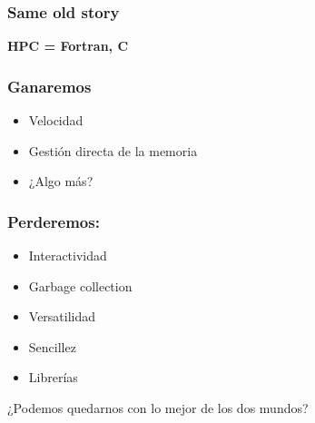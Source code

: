 \documentclass{beamer}
\begin{document}
\begin{frame}
  \frametitle{Same old story}
  \begin{center}
    \begin{Huge}
      \textbf{HPC = Fortran, C}
    \end{Huge}
  \end{center}
\end{frame}

\begin{frame}
  \frametitle{Ganaremos}
  \begin{itemize}
  \item Velocidad
  \item Gestión directa de la memoria
  \item ¿Algo más?
  \end{itemize}
\end{frame}

\begin{frame}
  \frametitle{Perderemos:}
  \begin{itemize}
  \item Interactividad
  \item Garbage collection
  \item Versatilidad
  \item Sencillez
  \item Librerías
  \end{itemize}
\end{frame}

\begin{frame}
  \begin{center}
    \begin{LARGE}
    ¿Podemos quedarnos con lo mejor de los dos mundos?      
    \end{LARGE}
  \end{center}
\end{frame}
\end{document}
